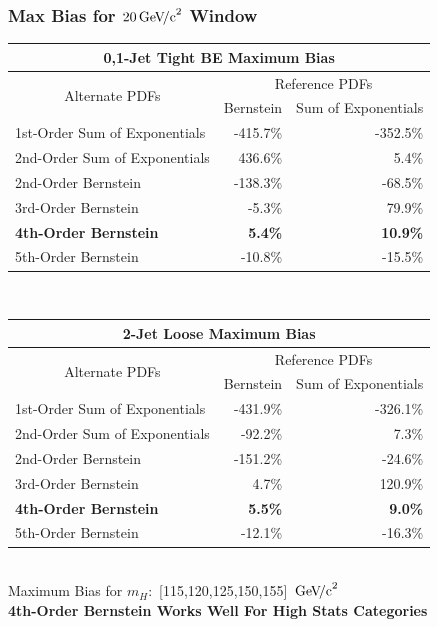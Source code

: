 \documentclass{beamer}
\newcommand{\GeVcc}{\ensuremath{\,\mathrm{Ge\kern -0.1em V\!/c}^2}}
\begin{document}
\begin{frame}
\frametitle{Max Bias for $20\GeVcc{}$ Window}
\tiny
\begin{center}
\begin{tabular}{|l|r|r|} \hline 
\multicolumn{3}{|c|}{ \bf 0,1-Jet Tight BE Maximum Bias} \\ \hline
\multicolumn{1}{|c|}{\multirow{2}{*}{Alternate PDFs}} & \multicolumn{2}{c|}{Reference PDFs} \\ \cline{2-3} 
& \multicolumn{1}{c|}{      Bernstein} & \multicolumn{1}{c|}{Sum of Exponentials}\\ \hline
1st-Order Sum of Exponentials &         -415.7\% &         -352.5\%  \\ \hline
2nd-Order Sum of Exponentials &          436.6\% &            5.4\%  \\ \hline
2nd-Order Bernstein &         -138.3\%  &          -68.5\%  \\ \hline
3rd-Order Bernstein &           -5.3\%  &           79.9\%  \\ \hline
\bf 4th-Order Bernstein &   \bf          5.4\%  &   \bf         10.9\% \\ \hline
5th-Order Bernstein &          -10.8\%  &          -15.5\% \\ \hline
\end{tabular}
\\ \vspace{1em}
\begin{tabular}{|l|r|r|} \hline 
\multicolumn{3}{|c|}{ \bf 2-Jet Loose Maximum Bias} \\ \hline
\multicolumn{1}{|c|}{\multirow{2}{*}{Alternate PDFs}} & \multicolumn{2}{c|}{Reference PDFs} \\ \cline{2-3} 
& \multicolumn{1}{c|}{      Bernstein}  & \multicolumn{1}{c|}{Sum of Exponentials}  \\ \hline
1st-Order Sum of Exponentials &         -431.9\% &         -326.1\%  \\ \hline
2nd-Order Sum of Exponentials &          -92.2\% &            7.3\%  \\ \hline
2nd-Order Bernstein &         -151.2\%  &          -24.6\%  \\ \hline
3rd-Order Bernstein &            4.7\%  &          120.9\%  \\ \hline
\bf 4th-Order Bernstein &  \bf           5.5\%  &   \bf          9.0\%  \\ \hline
5th-Order Bernstein &          -12.1\%  &          -16.3\%  \\ \hline
\end{tabular}
\\ \vspace{1em}
\scriptsize
Maximum Bias for $m_H:$ [115,120,125,150,155] \GeVcc{}
\\
\small
\bf
4th-Order Bernstein Works Well For High Stats Categories
\end{center}
\end{frame}
\end{document}
